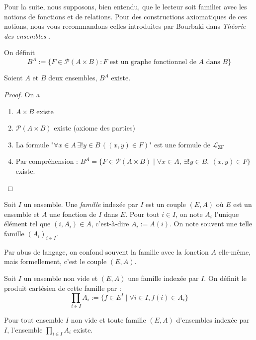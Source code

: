 Pour la suite, nous supposons, bien entendu, que le lecteur soit familier avec les notions de fonctions et de relations. Pour des constructions axiomatiques de ces notions, nous vous recommandons celles introduites par Bourbaki dans \emph{
Théorie des ensembles
}.
\begin{definition}
    On définit
    $$B^A := \{F \in \mathcal{P}(A \times B) : F \text{ est un graphe fonctionnel de } A \text{ dans } B\}$$
\end{definition}


\begin{proposition}
    Soient $A$ et $B$ deux ensembles, $B^A$ existe.
\end{proposition}

\begin{proof}
On a
    \begin{enumerate}
\item $A \times B$ existe
\item $\mathcal{P}(A \times B)$ existe (axiome des parties)
\item La formule "$\forall x \in A \, \exists! y \in B \, (( x, y ) \in F)$" est une formule de $\mathcal{L}_{\text{ZF}}$
\item Par compréhension : $B^A = \{F \in \mathcal{P}(A \times B) \mid \forall x \in A ,\ \exists! y \in B ,\ ( x, y ) \in F\}$ existe.
\end{enumerate}
\end{proof}

\begin{definition}
        Soit $I$ un ensemble. Une \emph{famille} indexée par $I$ est un couple $(E,A)$ où $E$ est un ensemble et $A$ une fonction de $I$ dans $E$.
    Pour tout $i \in I$, on note $A_i$ l'unique élément tel que $(i, A_i) \in A$, c'est-à-dire $A_i := A(i)$. On note souvent une telle famille $(A_i)_{i\in I}$.
\end{definition}

Par abus de langage, on confond souvent la famille avec la fonction $A$ elle-même, mais formellement, c'est le couple $(E, A)$.

\begin{definition}
        Soit $I$ un ensemble non vide et $(E, A)$ une famille
 indexée par $I$. On définit le produit cartésien de cette famille par :
        \[
        \prod_{i\in I}A_i:=\{f\in E^I \mid \forall i \in I, f(i)\in A_i\}
        \]
    \end{definition}

    \begin{proposition}
        Pour tout ensemble $I$ non vide et toute famille $(E, A)$ d'ensembles indexée par $I$, l'ensemble $\prod_{i\in I} A_i$ existe.
    \end{proposition}

